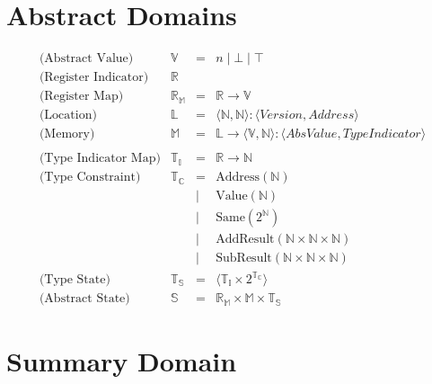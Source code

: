 \documentclass{article}
\begin{document}
\section{Abstract Domains}

\[
\begin{array}{lrcl}

\text{(Abstract Value)}
& \mathbb{V} & = & n \mid \bot \mid \top\\[4pt]

\text{(Register Indicator)}
& \mathbb{R} & & \\[4pt]

\text{(Register Map)}
& \mathbb{R}_{\mathbb{M}} & = & \mathbb{R} \rightarrow \mathbb{V}\\[4pt]

\text{(Location)}
& \mathbb{L} & = & \langle \mathbb{N}, \mathbb{N} \rangle : \langle Version, Address \rangle \\[4pt]

\text{(Memory)}
& \mathbb{M} & = & \mathbb{L} \rightarrow \langle \mathbb{V}, \mathbb{N} \rangle : \langle AbsValue, Type Indicator \rangle \\[4pt]

\\[4pt]

\text{(Type Indicator Map)}
& \mathbb{T}_{\mathbb{I}} & = & \mathbb{R} \rightarrow \mathbb{N}\\[4pt]

\text{(Type Constraint)}
& \mathbb{T}_\mathbb{C} & = &
    \mathrm{Address}(\mathbb{N})\\
& & | & \mathrm{Value}(\mathbb{N})\\
& & | & \mathrm{Same}(2 ^ {\mathbb{N}})\\
& & | & \mathrm{AddResult}(\mathbb{N}\times\mathbb{N}\times\mathbb{N})\\
& & | & \mathrm{SubResult}(\mathbb{N}\times\mathbb{N}\times\mathbb{N})\\

\text{(Type State)}
& \mathbb{T}_{\mathbb{S}} & = & \langle \mathbb{T}_{\mathbb{I}} \times 2^{\mathbb{T}_\mathbb{C}} \rangle\\[4pt]

\text{(Abstract State)}
& \mathbb{S} & = & \mathbb{R}_{\mathbb{M}} \times \mathbb{M} \times \mathbb{T}_{\mathbb{S}}

\end{array}
\]

\section{Summary Domain}
\end{document}
